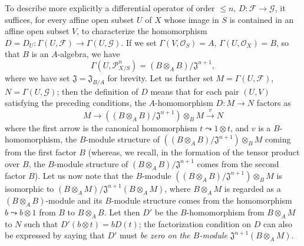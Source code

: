 \begin{env}[16.8.2]
\label{IV.16.8.2}
To describe more explicitly a differential operator of order
$\leq n$, $D:\mathscr{F}\to\mathscr{G}$, it suffices, for every affine open
subset $U$ of $X$ whose image in $S$ is contained in an affine open subset
$V$, to characterize the homomorphism
$D=D_U:\Gamma(U,\mathscr{F})\to\Gamma(U,\mathscr{G})$. If we set
$\Gamma(V,\mathcal{O}_S)=A$, $\Gamma(U,\mathcal{O}_X)=B$, so that $B$
is an $A$-algebra, we have
\[
  \Gamma(U,\mathscr{P}_{X/S}^n)
  =(B\otimes_A B)/\mathfrak{J}^{n+1},
\]
where we have set $\mathfrak{J}=\mathfrak{J}_{B/A}$ for brevity. Let us
further set $M=\Gamma(U,\mathscr{F})$, $N=\Gamma(U,\mathscr{G})$; then the
definition of $D$ means that for each pair $(U,V)$ satisfying the
preceding conditions, the $A$-homomorphism $D:M\to N$ factors as
\[
  M\longrightarrow
  ((B\otimes_A B)/\mathfrak{J}^{n+1})\otimes_B M
  \xrightarrow{v}N
\]
where the first arrow is the canonical homomorphism $t\leadsto1\otimes t$, and
$v$ is a $B$-homomorphism, the $B$-module structure of
$((B\otimes_A B)/\mathfrak{J}^{n+1})\otimes_B M$ coming from the first
factor $B$ (whereas, we recall, in the formation of the tensor product
over $B$, the $B$-module structure of
$(B\otimes_A B)/\mathfrak{J}^{n+1}$ comes from the second factor $B$). Let us
now note that the $B$-module
$((B\otimes_A B)/\mathfrak{J}^{n+1})\otimes_B M$ is isomorphic to
$(B\otimes_A M)/\mathfrak{J}^{n+1}(B\otimes_A M)$, where $B\otimes_A M$ is
regarded as a $(B\otimes_A B)$-module and its $B$-module structure
comes from the homomorphism $b\leadsto b\otimes1$ from $B$ to $B\otimes_A B$.
Let then $D'$ be the $B$-homomorphism from $B\otimes_A M$ to $N$ such that
$D'(b\otimes t)=bD(t)$; the factorization condition on $D$ can also be
expressed by saying that $D'$ must \emph{be zero on the $B$-module}
$\mathfrak{J}^{n+1}(B\otimes_A M)$.
\end{env}

